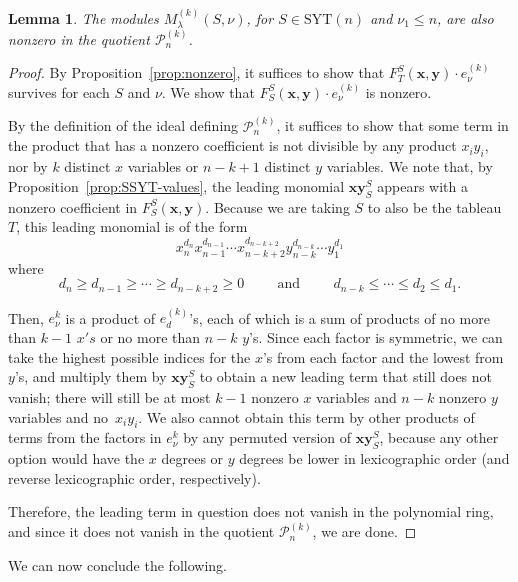 \documentclass[11pt]{article}
\newtheorem{lemma}[theo]{Lemma}
\theoremstyle{definition}
\numberwithin{equation}{section}
\newcommand{\SYT}{\mathrm{SYT}}
\begin{document}
\begin{lemma}\label{lem:still-nonzero}
	The modules $M^{(k)}_\lambda(S,\nu)$, for $S\in \SYT(n)$ and $\nu_1\le n$, are also nonzero in the quotient $\mathcal{P}_n^{(k)}$.
\end{lemma}

\begin{proof}
	By Proposition~\ref{prop:nonzero}, it suffices to show that $F_T^S(\mathbf{x},\mathbf{y})\cdot e_\nu^{(k)}$ survives for each $S$ and $\nu$.   We show that $F_S^S(\mathbf{x},\mathbf{y})\cdot e_\nu^{(k)}$ is nonzero.
	
	By the definition of the ideal defining $\mathcal{P}_n^{(k)}$, it suffices to show that some term in the product that has a nonzero coefficient is not divisible by any product $x_iy_i$, nor by $k$ distinct $x$ variables or $n-k+1$ distinct $y$ variables.  We note that, by Proposition~\ref{prop:SSYT-values}, the leading monomial $\mathbf{xy}_S^S$ appears with a nonzero coefficient in $F_S^S(\mathbf{x},\mathbf{y})$.  Because we are taking $S$ to also be the tableau $T$, this leading monomial is of the form $$x_n^{d_n}x_{n-1}^{d_{n-1}}\cdots x_{n-k+2}^{d_{n-k+2}} y_{n-k}^{d_{n-k}}\cdots y_1^{d_1}$$ where $$d_n\ge d_{n-1}\ge \cdots \ge d_{n-k+2}\ge 0\hspace{1cm}\text{and} \hspace{1cm} d_{n-k}\le \cdots \le d_2\le d_1.$$
	
	Then, $e_\nu^{k}$ is a product of $e_d^{(k)}$'s, each of which is a sum of products of no more than $k-1$ $x's$ or no more than $n-k$ $y$'s.  Since each factor is symmetric, we can take the highest possible indices for the $x$'s from each factor and the lowest from $y$'s, and multiply them by $\mathbf{xy}_S^S$ to obtain a new leading term that still does not vanish; there will still be at most $k-1$ nonzero $x$ variables and $n-k$ nonzero $y$ variables and no~$x_iy_i$.  We also cannot obtain this term by other products of terms from the factors in $e_\nu^{k}$ by any permuted version of $\mathbf{xy}_S^S$, because any other option would have the $x$ degrees or $y$ degrees be lower in lexicographic order (and reverse lexicographic order, respectively).  
	
	Therefore, the leading term in question does not vanish in the polynomial ring, and since it does not vanish in the quotient $\mathcal{P}_n^{(k)}$, we are done.
\end{proof}

We can now conclude the following.
\end{document}
